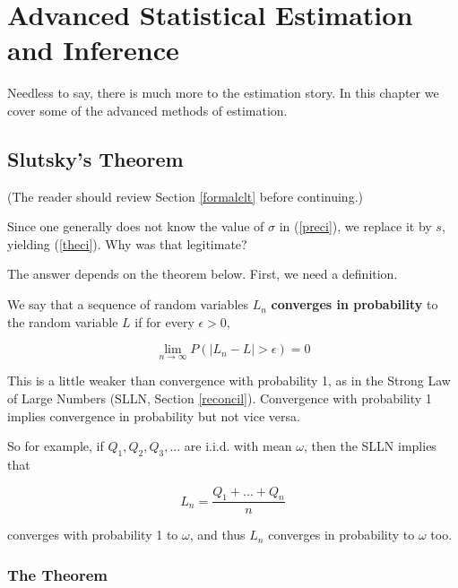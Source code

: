 \chapter{Advanced Statistical Estimation and Inference} 
\label{chap:estadv} 

Needless to say, there is much more to the estimation story.  In this
chapter we cover some of the advanced methods of estimation.

\section{Slutsky's Theorem}
\label{slutsky}

(The reader should review Section \ref{formalclt} before continuing.)

Since one generally does not know the value of $\sigma$ in
(\ref{preci}), we replace it by $s$, yielding (\ref{theci}).  Why was
that legitimate?  

The answer depends on the theorem below.  First, we need a definition.

\begin{definition}
We say that a sequence of random variables $L_n$ {\bf converges in
probability} to the random variable $L$ if for every $\epsilon > 0$,

\begin{equation}
\lim_{{n} \rightarrow \infty} P(|L_n -L| > \epsilon)  = 0
\end{equation}

\end{definition}

This is a little weaker than convergence with probability 1, as in the
Strong Law of Large Numbers (SLLN, Section \ref{reconcil}).  Convergence
with probability 1 implies convergence in probability but not vice
versa.

So for example, if $Q_1, Q_2, Q_3,...$ are i.i.d. with mean $\omega$,
then the SLLN implies that

\begin{equation}
L_n = \frac{Q_1+...+Q_n}{n}
\end{equation}

converges with probability 1 to $\omega$, and thus $L_n$ converges in
probability to $\omega$ too.

\subsection{The Theorem}

